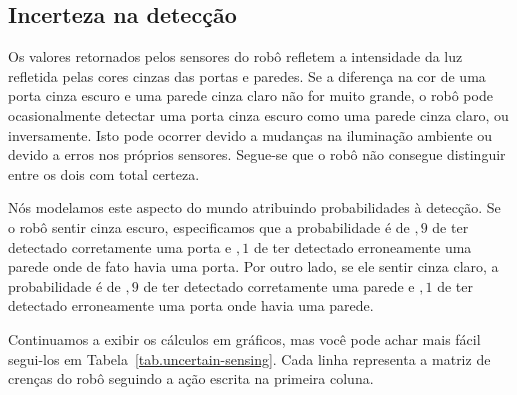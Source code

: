 \subsection{Incerteza na detecção}

Os valores retornados pelos sensores do robô refletem a intensidade da luz refletida pelas cores cinzas das portas e paredes. Se a diferença na cor de uma porta cinza escuro e uma parede cinza claro não for muito grande, o robô pode ocasionalmente detectar uma porta cinza escuro como uma parede cinza claro, ou inversamente. Isto pode ocorrer devido a mudanças na iluminação ambiente ou devido a erros nos próprios sensores. Segue-se que o robô não consegue distinguir entre os dois com total certeza.

Nós modelamos este aspecto do mundo atribuindo probabilidades à detecção. Se o robô sentir cinza escuro, especificamos que a probabilidade é de $,9$ de ter detectado corretamente uma porta e $,1$ de ter detectado erroneamente uma parede onde de fato havia uma porta. Por outro lado, se ele sentir cinza claro, a probabilidade é de $,9$ de ter detectado corretamente uma parede e $,1$ de ter detectado erroneamente uma porta onde havia uma parede.

Continuamos a exibir os cálculos em gráficos, mas você pode achar mais fácil segui-los em Tabela~\ref{tab.uncertain-sensing}. Cada linha representa a matriz de crenças do robô seguindo a ação escrita na primeira coluna.

